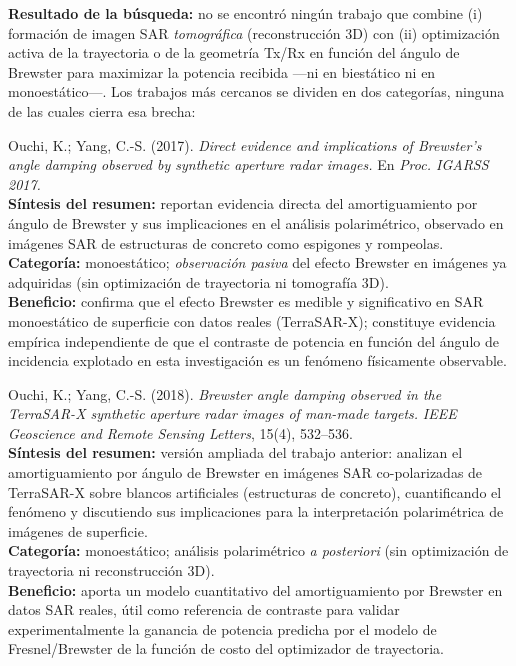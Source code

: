 \documentclass[11pt,a4paper]{report}
\begin{document}
\textbf{Resultado de la búsqueda:} no se encontró ningún trabajo que
combine (i) formación de imagen SAR \emph{tomográfica} (reconstrucción 3D)
con (ii) optimización activa de la trayectoria o de la geometría Tx/Rx en
función del ángulo de Brewster para maximizar la potencia recibida ---ni en
biestático ni en monoestático---. Los trabajos más cercanos se dividen en dos
categorías, ninguna de las cuales cierra esa brecha:

\begin{enumerate}[label=\textbf{[E\arabic*]}, leftmargin=2.2cm, itemsep=10pt]

\item Ouchi, K.; Yang, C.-S. (2017). \textit{Direct evidence and
implications of Brewster's angle damping observed by synthetic aperture
radar images.} En \emph{Proc. IGARSS 2017.} \cite{ouchi2017}\\
\textbf{Síntesis del resumen:} reportan evidencia directa del
amortiguamiento por ángulo de Brewster y sus implicaciones en el análisis
polarimétrico, observado en imágenes SAR de estructuras de concreto como
espigones y rompeolas.\\
\textbf{Categoría:} monoestático; \emph{observación pasiva} del efecto
Brewster en imágenes ya adquiridas (sin optimización de trayectoria ni
tomografía 3D).\\
\textbf{Beneficio:} confirma que el efecto Brewster es medible y
significativo en SAR monoestático de superficie con datos reales
(TerraSAR-X); constituye evidencia empírica independiente de que el
contraste de potencia en función del ángulo de incidencia explotado en esta
investigación es un fenómeno físicamente observable.

\item Ouchi, K.; Yang, C.-S. (2018). \textit{Brewster angle damping
observed in the TerraSAR-X synthetic aperture radar images of man-made
targets.} \emph{IEEE Geoscience and Remote Sensing Letters}, 15(4),
532--536. \cite{ouchi2018}\\
\textbf{Síntesis del resumen:} versión ampliada del trabajo anterior:
analizan el amortiguamiento por ángulo de Brewster en imágenes SAR
co-polarizadas de TerraSAR-X sobre blancos artificiales (estructuras de
concreto), cuantificando el fenómeno y discutiendo sus implicaciones para la
interpretación polarimétrica de imágenes de superficie.\\
\textbf{Categoría:} monoestático; análisis polarimétrico \emph{a posteriori}
(sin optimización de trayectoria ni reconstrucción 3D).\\
\textbf{Beneficio:} aporta un modelo cuantitativo del amortiguamiento por
Brewster en datos SAR reales, útil como referencia de contraste para validar
experimentalmente la ganancia de potencia predicha por el modelo de
Fresnel/Brewster de la función de costo del optimizador de trayectoria.


\end{enumerate}
\end{document}
